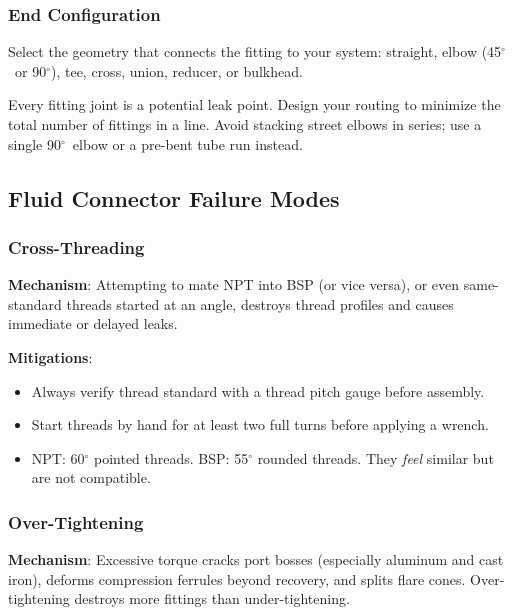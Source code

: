 \documentclass[11pt,letterpaper,twoside,openany]{book}
\providecommand{\ang}[1]{#1\ensuremath{{}^{\circ}}}
\begin{document}
\subsubsection{End Configuration}

Select the geometry that connects the fitting to your system: straight, elbow (45$^{\circ}$\ or 90$^{\circ}$), tee, cross, union, reducer, or bulkhead. 

\begin{tipbox}
Every fitting joint is a potential leak point. Design your routing to minimize the total number of fittings in a line. Avoid stacking street elbows in series; use a single 90$^{\circ}$\ elbow or a pre-bent tube run instead.
\end{tipbox}


\subsection{Fluid Connector Failure Modes}
\label{sec:fluidfailure}

\subsubsection{Cross-Threading}

\textbf{Mechanism}: Attempting to mate NPT into BSP (or vice versa), or even same-standard threads started at an angle, destroys thread profiles and causes immediate or delayed leaks.

\textbf{Mitigations}:
\begin{itemize}[nosep,leftmargin=1.5em]
  \item Always verify thread standard with a thread pitch gauge before assembly.
  \item Start threads by hand for at least two full turns before applying a wrench.
  \item NPT: \ang{60} pointed threads. BSP: \ang{55} rounded threads. They \emph{feel} similar but are not compatible.
\end{itemize}

\subsubsection{Over-Tightening}

\textbf{Mechanism}: Excessive torque cracks port bosses (especially aluminum and cast iron), deforms compression ferrules beyond recovery, and splits flare cones. Over-tightening destroys more fittings than under-tightening.
\end{document}

